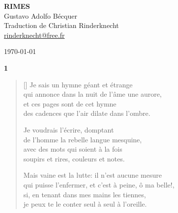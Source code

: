 \documentclass[a4paper,12pt]{book}
\begin{document}
\thispagestyle{empty}
\vspace*{70mm}
\begin{center}
{\Huge\textbf{RIMES}} \\
\vspace*{10mm}
{\Large Gustavo Adolfo Bécquer} \\
\vspace*{10mm}
Traduction de Christian Rinderknecht\\
\url{rinderknecht@free.fr}
\end{center}

\centerline\today

\cleardoublepage

\frenchspacing  %



\newpage

\begin{center}
  \textbf{1}
\end{center}

\settowidth{\versewidth}{qui puisse l'enfermer, et c'est à peine, ô ma belle!,}

\begin{verse}[\versewidth]
  Je sais un hymne géant et étrange \\
  qui annonce dans la nuit de l'âme une aurore, \\
  et ces pages sont de cet hymne \\
  des cadences que l'air dilate dans l'ombre.

  Je voudrais l'écrire, domptant \\
  de l'homme la rebelle langue mesquine, \\
  avec des mots qui soient à la fois \\
  soupirs et rires, couleurs et notes.

  Mais vaine est la lutte: il n'est aucune mesure \\
  qui puisse l'enfermer, et c'est à peine, ô ma belle!, \\
  si, en tenant dans mes mains les tiennes, \\
  je peux te le conter seul à seul à l'oreille.
\end{verse}
\end{document}
